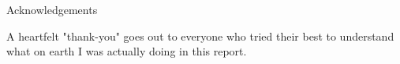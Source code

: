\begin{centerpage}{Acknowledgements}

  A heartfelt "thank-you" goes out to everyone who tried their best to understand what on earth I was actually doing in this report.

\end{centerpage}